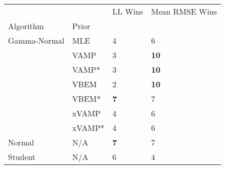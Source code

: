 \begin{tabular}{llll}
\toprule
        &     &     LL Wins & Mean RMSE Wins \\
Algorithm & Prior &             &                \\
\midrule
Gamma-Normal & MLE &           4 &              6 \\
        & VAMP &           3 &    \textbf{10} \\
        & VAMP* &           3 &    \textbf{10} \\
        & VBEM &           2 &    \textbf{10} \\
        & VBEM* &  \textbf{7} &              7 \\
        & xVAMP &           4 &              6 \\
        & xVAMP* &           4 &              6 \\
Normal & N/A &  \textbf{7} &              7 \\
Student & N/A &           6 &              4 \\
\bottomrule
\end{tabular}


